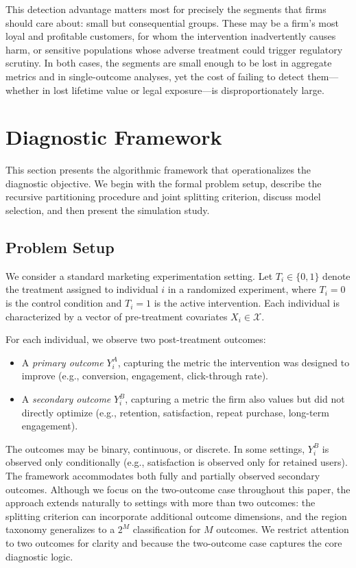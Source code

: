\documentclass[11pt,letterpaper,english]{article}
\theoremstyle{definition}
\theoremstyle{definition}
\begin{document}
\begin{bibunit}
This detection advantage matters most for precisely the segments that firms should care about: small but consequential groups. These may be a firm's most loyal and profitable customers, for whom the intervention inadvertently causes harm, or sensitive populations whose adverse treatment could trigger regulatory scrutiny. In both cases, the segments are small enough to be lost in aggregate metrics and in single-outcome analyses, yet the cost of failing to detect them---whether in lost lifetime value or legal exposure---is disproportionately large.


\section{Diagnostic Framework}
\label{sec:framework}

This section presents the algorithmic framework that operationalizes the diagnostic objective. We begin with the formal problem setup, describe the recursive partitioning procedure and joint splitting criterion, discuss model selection, and then present the simulation study.

\subsection{Problem Setup}
\label{sec:problem}

We consider a standard marketing experimentation setting. Let $T_i \in \{0,1\}$ denote the treatment assigned to individual $i$ in a randomized experiment, where $T_i=0$ is the control condition and $T_i=1$ is the active intervention. Each individual is characterized by a vector of pre-treatment covariates $X_i \in \mathcal{X}$.

For each individual, we observe two post-treatment outcomes:
\begin{itemize}[leftmargin=2em]
    \item A \emph{primary outcome} $Y_i^A$, capturing the metric the intervention was designed to improve (e.g., conversion, engagement, click-through rate).
    \item A \emph{secondary outcome} $Y_i^B$, capturing a metric the firm also values but did not directly optimize (e.g., retention, satisfaction, repeat purchase, long-term engagement).
\end{itemize}

The outcomes may be binary, continuous, or discrete. In some settings, $Y_i^B$ is observed only conditionally (e.g., satisfaction is observed only for retained users). The framework accommodates both fully and partially observed secondary outcomes. Although we focus on the two-outcome case throughout this paper, the approach extends naturally to settings with more than two outcomes: the splitting criterion can incorporate additional outcome dimensions, and the region taxonomy generalizes to a $2^M$ classification for $M$ outcomes. We restrict attention to two outcomes for clarity and because the two-outcome case captures the core diagnostic logic.


\end{bibunit}
\end{document}
